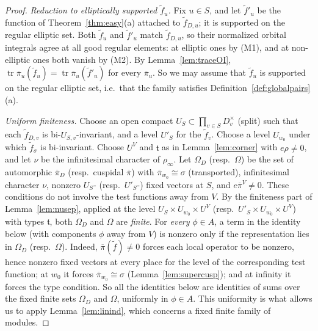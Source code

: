 \documentclass[12pt]{article}
\newcommand{\ov}[1]{\overline{#1}}
\newcommand{\tr}{\operatorname{tr}}
\newcommand{\pib}{\ov{\pi}}
\theoremstyle{plain}
\theoremstyle{definition}
\begin{document}
\begin{proof}
\emph{Reduction to elliptically supported $\tilde f_u$.} Fix $u\in S$, and let $\tilde f'_u$ be the function of Theorem~\ref{thm:easy}(a) attached to $\tilde f_{D,u}$; it is supported on the regular elliptic set. Both $\tilde f_u$ and $\tilde f'_u$ match $\tilde f_{D,u}$, so their normalized orbital integrals agree at all good regular elements: at elliptic ones by (M1), and at non-elliptic ones both vanish by (M2). By Lemma~\ref{lem:traceOI}, $\tr\pib_u(\tilde f_u)=\tr\pib_u(\tilde f'_u)$ for every $\pib_u$. So we may assume that $\tilde f_u$ is supported on the regular elliptic set, i.e.\ that the family satisfies Definition~\ref{def:globalpairs}(a).

\emph{Uniform finiteness.} Choose an open compact $U_S\subset\prod_{v\in S}D_v^\times$ (split) such that each $\tilde f_{D,v}$ is bi-$U_{S,v}$-invariant, and a level $U'_S$ for the $\tilde f_v$. Choose a level $U_{w_0}$ under which $\tilde f_\sigma$ is bi-invariant. Choose $U^V$ and $\mathfrak t$ as in Lemma~\ref{lem:corner} with $e\rho\neq0$, and let $\nu$ be the infinitesimal character of $\rho_\infty$. Let $\Omega_D$ (resp.\ $\Omega$) be the set of automorphic $\pib_D$ (resp.\ cuspidal $\pib$) with $\pib_{w_0}\cong\sigma$ (transported), infinitesimal character $\nu$, nonzero $U_S$- (resp.\ $U'_S$-) fixed vectors at $S$, and $e\pib^V\neq0$. These conditions do not involve the test functions away from $V$. By the finiteness part of Lemma~\ref{lem:nusep}, applied at the level $U_S\times U_{w_0}\times U^V$ (resp.\ $U'_S\times U_{w_0}\times U^V$) with types $\mathfrak t$, both $\Omega_D$ and $\Omega$ are \emph{finite}. For \emph{every} $\phi\in A$, a term in the identity below (with components $\phi$ away from $V$) is nonzero only if the representation lies in $\Omega_D$ (resp.\ $\Omega$). Indeed, $\pib(\tilde f)\neq0$ forces each local operator to be nonzero, hence nonzero fixed vectors at every place for the level of the corresponding test function; at $w_0$ it forces $\pib_{w_0}\cong\sigma$ (Lemma~\ref{lem:supercusp}); and at infinity it forces the type condition. So all the identities below are identities of sums over the fixed finite sets $\Omega_D$ and $\Omega$, uniformly in $\phi\in A$. This uniformity is what allows us to apply Lemma~\ref{lem:linind}, which concerns a fixed finite family of modules.


\end{proof}
\end{document}
